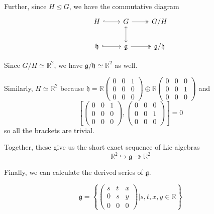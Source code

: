 \documentclass[12pt]{article}
\newcommand{\R}{\mathbb{R}}
\newcommand{\g}{\mathfrak{g}}
\begin{document}
        Further, since $H \trianglelefteq G$, we have the commutative diagram
        \[\begin{tikzcd}
            H \arrow[hook]{r} & G \arrow[two heads]{r} & G/H\\
            \mathfrak{h} \arrow[hook]{r} & \mathfrak{g} \arrow[two heads]{r} \arrow[leftrightarrow]{u} & \mathfrak{g}/\mathfrak{h}   
        \end{tikzcd}\]

        Since $G/H \simeq \R^2$, we have $\mathfrak{g}/\mathfrak{h} \simeq \R^2$ as well. 
        
        Similarly, $H \simeq \R^2$ because $\mathfrak{h} = \R \begin{pmatrix}
            0 & 0 & 1\\ 
            0 & 0 & 0\\
            0 & 0 & 0
        \end{pmatrix} \oplus \R \begin{pmatrix}
            0 & 0 & 0\\ 
            0 & 0 & 1\\
            0 & 0 & 0
        \end{pmatrix}$ and 
        \[\left[\begin{pmatrix}
            0 & 0 & 1\\ 
            0 & 0 & 0\\
            0 & 0 & 0
        \end{pmatrix}, \begin{pmatrix}
            0 & 0 & 0\\ 
            0 & 0 & 1\\
            0 & 0 & 0
        \end{pmatrix}\right] = 0\]
        so all the brackets are trivial. 

        Together, these give us the short exact sequence of Lie algebras
        \[\R^2 \hookrightarrow \mathfrak{g} \twoheadrightarrow \R^2\]

        Finally, we can calculate the derived series of $\mathfrak{g}$. 

        \[\g = \left\{\begin{pmatrix}
            s & t & x\\ 
            0 & s & y\\
            0 & 0 & 0
        \end{pmatrix} \bigg\vert s, t, x, y \in \R\right\}\]
\end{document}
